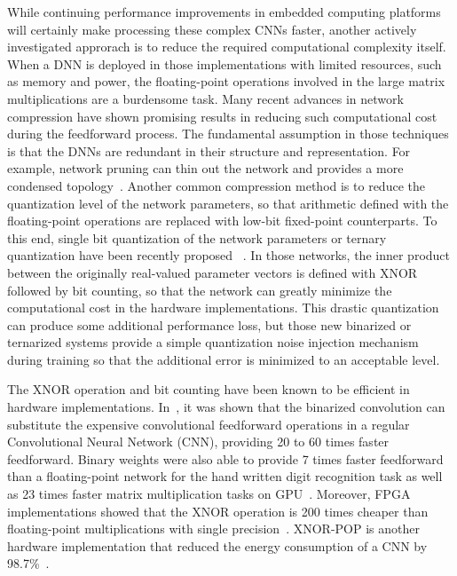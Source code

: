 
While continuing performance improvements in embedded computing
platforms will certainly make processing these complex CNNs faster,
another actively investigated approrach is to reduce the required
computational complexity itself.
When a DNN is deployed in those implementations with limited
resources, such as memory and power, the floating-point operations
involved in the large matrix multiplications are a burdensome task.
Many recent advances in network compression have shown promising results
in reducing such computational cost during the feedforward
process. The fundamental assumption in those techniques is that the
DNNs are redundant in their structure and representation. For example,
network pruning can thin out the network and provides a more condensed
topology~\cite{han2015deep}.
Another common compression method is to reduce the
quantization level of the network parameters, so that arithmetic
defined with the floating-point operations are replaced with low-bit
fixed-point counterparts. To this end, single bit quantization of the
network parameters or ternary quantization have been recently proposed
~\cite{hwang2014fixed,soudry2014expectation,kim2016bitwise,rastegari2016xnor,hubara2016binarized,beauchamp2006embedded,govindu2004analysis}.
In those networks, the inner product between the
originally real-valued parameter vectors is defined with XNOR followed
by bit counting, so that the network can greatly minimize the
computational cost in the hardware implementations. This drastic
quantization can produce some additional performance loss, but those
new binarized or ternarized systems provide a simple quantization
noise injection mechanism during training so that the additional error
is minimized to an acceptable level.

The XNOR operation and bit counting have been known to be efficient in
hardware implementations. In~\cite{rastegari2016xnor}, it was shown
that the binarized convolution can substitute the expensive
convolutional feedforward operations in a regular Convolutional Neural
Network (CNN), %
providing 20 to 60 times faster feedforward. Binary weights were also
able to provide 7 times faster feedforward than a floating-point
network for the hand written digit recognition task as well as 23
times faster matrix multiplication tasks on
GPU~\cite{hubara2016binarized}.
Moreover, FPGA implementations showed that the XNOR operation is 200
times cheaper than floating-point multiplications with 
single precision~\cite{beauchamp2006embedded,govindu2004analysis}.
XNOR-POP is another hardware implementation that reduced
the energy consumption of a CNN by 98.7\%~\cite{jiang2017xnor}.

